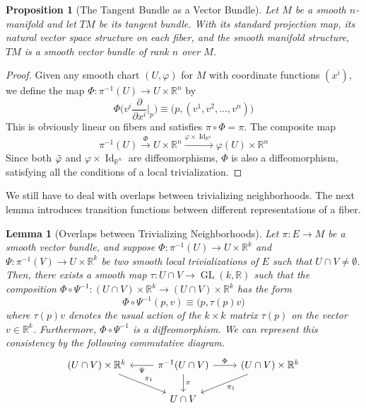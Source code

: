 \documentclass{article}
\DeclareMathOperator{\GL}{GL}
\DeclareMathOperator{\Id}{Id}
\newtheorem{proposition}[theorem]{Proposition}
\newtheorem{lemma}[theorem]{Lemma}
\theoremstyle{remark}
\theoremstyle{definition}
\begin{document}
  \begin{proposition}[The Tangent Bundle as a Vector Bundle]
  Let $M$ be a smooth $n$-manifold and let $TM$ be its tangent bundle. With its standard projection map, its natural vector space structure on each fiber, and the smooth manifold structure, $TM$ is a smooth vector bundle of rank $n$ over $M$. 
  \end{proposition}
  \begin{proof}
  Given any smooth chart $(U, \varphi)$ for $M$ with coordinate functions $(x^i)$, we define the map $\Phi: \pi^{-1} (U) \longrightarrow U \times \mathbb{R}^n$ by 
  \[\Phi \bigg( v^i \frac{\partial}{\partial x^i} \bigg|_p \bigg) \equiv \big( p, (v^1, v^2, ..., v^n)\big)\]
  This is obviously linear on fibers and satisfies $\pi \circ \Phi = \pi$. The composite map 
  \[\pi^{-1} (U) \xrightarrow{\Phi} U \times \mathbb{R}^n \xrightarrow{\varphi \times \Id_{\mathbb{R}^n}} \varphi(U) \times \mathbb{R}^n\]
  Since both $\Tilde{\varphi}$ and $\varphi \times \Id_{\mathbb{R}^n}$ are diffeomorphisms, $\Phi$ is also a diffeomorphism, satisfying all the conditions of a local trivialization. 
  \end{proof}

  We still have to deal with overlaps between trivializing neighborhoods. The next lemma introduces transition functions between different representations of a fiber. 

  \begin{lemma}[Overlaps between Trivializing Neighborhoods]
  Let $\pi: E \longrightarrow M$ be a smooth vector bundle, and suppose $\Phi: \pi^{-1} (U) \longrightarrow U \times \mathbb{R}^k$ and $\Psi: \pi^{-1} (V) \longrightarrow U \times \mathbb{R}^k$ be two smooth local trivializations of $E$ such that $U \cap V \neq \emptyset$. Then, there exists a smooth map $\tau: U \cap V \longrightarrow \GL(k, \mathbb{R})$ such that the composition $\Phi \circ \Psi^{-1} : (U \cap V) \times \mathbb{R}^k \longrightarrow (U \cap V) \times \mathbb{R}^k$ has the form
  \[\Phi \circ \Psi^{-1} (p, v) \equiv \big(p, \tau(p) v \big)\]
  where $\tau(p) v$ denotes the usual action of the $k \times k$ matrix $\tau(p)$ on the vector $v \in \mathbb{R}^k$. Furthermore, $\Phi \circ \Psi^{-1}$ is a diffeomorphism. We can represent this consistency by the following commutative diagram. 
  \[\begin{tikzcd}
  (U \cap V) \times \mathbb{R}^k \arrow{dr}{\pi_1}& \pi^{-1} (U \cap V) \arrow{l}{\Psi} \arrow{r}{\Phi} \arrow{d}{\pi} & (U \cap V) \times \mathbb{R}^k \arrow{dl}{\pi_1}\\
  & U \cap V & 
  \end{tikzcd}\]
  \end{lemma}
\end{document}
